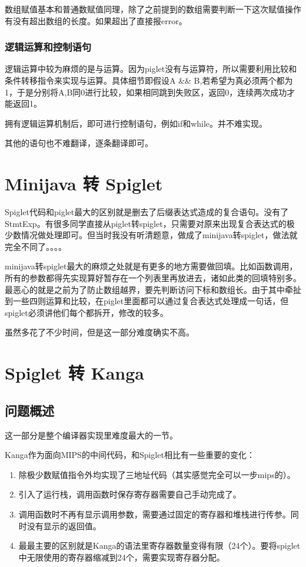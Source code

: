 \documentclass[10pt,a4paper]{article}
\begin{document}
数组赋值基本和普通数赋值同理，除了之前提到的数组需要判断一下这次赋值操作有没有超出数组的长度。如果超出了直接报error。

\subsubsection{逻辑运算和控制语句}

逻辑运算中较为麻烦的是与运算。因为piglet没有与运算符，所以需要利用比较和条件转移指令来实现与运算。具体细节即假设A \&\& B,若希望为真必须两个都为1，于是分别将A,B同0进行比较，如果相同跳到失败区，返回0，连续两次成功才能返回1。

拥有逻辑运算机制后，即可进行控制语句，例如if和while。并不难实现。

其他的语句也不难翻译，逐条翻译即可。

\section{Minijava 转 Spiglet}

Spiglet代码和piglet最大的区别就是删去了后缀表达式造成的复合语句。没有了StmtExp。有很多同学直接从piglet转spiglet，只需要对原来出现复合表达式的极少数情况做处理即可。但当时我没有听清题意，做成了minijava转spiglet，做法就完全不同了。。。。

minijava转spiglet最大的麻烦之处就是有更多的地方需要做回填。比如函数调用，所有的参数都得先实现算好暂存在一个列表里再放进去，诸如此类的回填特别多。最恶心的就是之前为了防止数组越界，要先判断访问下标和数组长。由于其中牵扯到一些四则运算和比较，在piglet里面都可以通过复合表达式处理成一句话，但spiglet必须讲他们每个都拆开，修改的较多。

虽然多花了不少时间，但是这一部分难度确实不高。

\section{Spiglet 转 Kanga}

\subsection{问题概述}

这一部分是整个编译器实现里难度最大的一节。

Kanga作为面向MIPS的中间代码，和Spiglet相比有一些重要的变化：
\begin{enumerate}
	\item 除极少数赋值指令外均实现了三地址代码（其实感觉完全可以一步mips的）。
	\item 引入了运行栈，调用函数时保存寄存器需要自己手动完成了。
	\item 调用函数时不再有显示调用参数，需要通过固定的寄存器和堆栈进行传参。同时没有显示的返回值。
	\item 最最主要的区别就是Kanga的语法里寄存器数量变得有限（24个）。要将spiglet中无限使用的寄存器缩减到24个，需要实现寄存器分配。
\end{enumerate}
\end{document}
